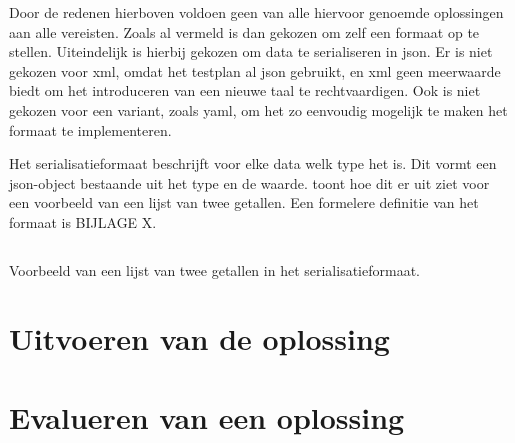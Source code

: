 Door de redenen hierboven voldoen geen van alle hiervoor genoemde oplossingen aan alle vereisten.
Zoals al vermeld is dan gekozen om zelf een formaat op te stellen.
Uiteindelijk is hierbij gekozen om data te serialiseren in json.
Er is niet gekozen voor xml, omdat het testplan al json gebruikt, en xml geen meerwaarde biedt om het introduceren van een nieuwe taal te rechtvaardigen.
Ook is niet gekozen voor een variant, zoals yaml, om het zo eenvoudig mogelijk te maken het formaat te implementeren.

Het serialisatieformaat beschrijft voor elke data welk type het is.
Dit vormt een json-object bestaande uit het type en de waarde.
 toont hoe dit er uit ziet voor een voorbeeld van een lijst van twee getallen.
Een formelere definitie van het formaat is BIJLAGE X.

\begin{listing}[h]
    \inputminted{json}{code/format.json}
    \caption{Voorbeeld van een lijst van twee getallen in het serialisatieformaat.}
    \label{lst:serialisation-format}
\end{listing}

\section{Uitvoeren van de oplossing}

\section{Evalueren van een oplossing}

